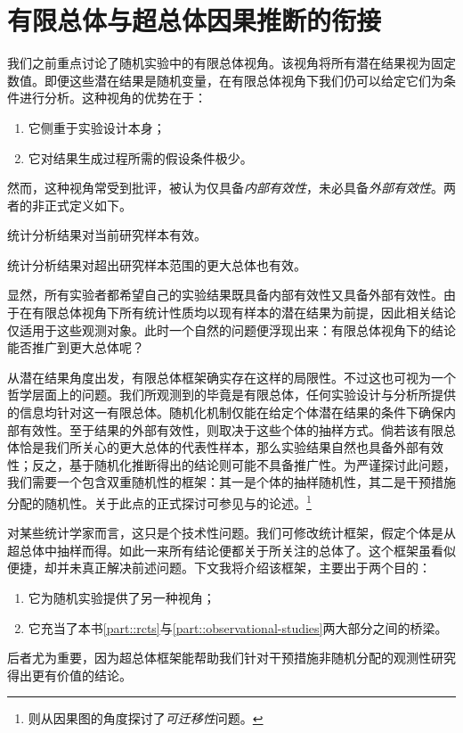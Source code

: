 \chapter{有限总体与超总体因果推断的衔接}\label{chapter::bridging}


 


我们之前重点讨论了随机实验中的有限总体视角。该视角将所有潜在结果视为固定数值。即便这些潜在结果是随机变量，在有限总体视角下我们仍可以给定它们为条件进行分析。这种视角的优势在于：
\begin{enumerate}
\item
它侧重于实验设计本身；
\item
它对结果生成过程所需的假设条件极少。
\end{enumerate}
然而，这种视角常受到批评，被认为仅具备{\it 内部有效性}，未必具备{\it 外部有效性}。两者的非正式定义如下。 

\begin{definition}
[内部有效性]
统计分析结果对当前研究样本有效。 
\end{definition}


\begin{definition}
[外部有效性]
统计分析结果对超出研究样本范围的更大总体也有效。 
\end{definition}



显然，所有实验者都希望自己的实验结果既具备内部有效性又具备外部有效性。由于在有限总体视角下所有统计性质均以现有样本的潜在结果为前提，因此相关结论仅适用于这些观测对象。此时一个自然的问题便浮现出来：有限总体视角下的结论能否推广到更大总体呢？ 



从潜在结果角度出发，有限总体框架确实存在这样的局限性。不过这也可视为一个哲学层面上的问题。我们所观测到的毕竟是有限总体，任何实验设计与分析所提供的信息均针对这一有限总体。随机化机制仅能在给定个体潜在结果的条件下确保内部有效性。至于结果的外部有效性，则取决于这些个体的抽样方式。倘若该有限总体恰是我们所关心的更大总体的代表性样本，那么实验结果自然也具备外部有效性；反之，基于随机化推断得出的结论则可能不具备推广性。为严谨探讨此问题，我们需要一个包含双重随机性的框架：其一是个体的抽样随机性，其二是干预措施分配的随机性。关于此点的正式探讨可参见\citet{miratrix2018worth}与\citet{abadie2020sampling}的论述。\footnote{\citet{pearl2014external}则从因果图的角度探讨了{\it 可迁移性}问题。}
  
  
  
  
对某些统计学家而言，这只是个技术性问题。我们可修改统计框架，假定个体是从超总体中抽样而得。如此一来所有结论便都关于所关注的总体了。这个框架虽看似便捷，却并未真正解决前述问题。下文我将介绍该框架，主要出于两个目的：
\begin{enumerate}
\item
它为随机实验提供了另一种视角；
\item
它充当了本书\ref{part::rcts}与\ref{part::observational-studies}两大部分之间的桥梁。
\end{enumerate}
后者尤为重要，因为超总体框架能帮助我们针对干预措施非随机分配的观测性研究得出更有价值的结论。 





